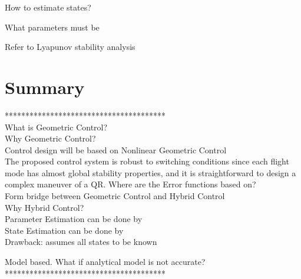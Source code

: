 How to estimate states?



What parameters must be 

Refer to Lyapunov stability analysis \cite{Bullo2005}

\section{Summary}

***************************************\\
What is Geometric Control?\\
Why Geometric Control?\\
Control design will be based on Nonlinear Geometric Control\\

The proposed control system is robust to switching conditions since each flight mode has almost global stability properties, and it is straightforward to design a complex maneuver of a QR. \cite{Lee2010c}
Where are the Error functions based on?\\

Form bridge between Geometric Control and Hybrid Control\\
Why Hybrid Control?\\
Parameter Estimation can be done by\\

State Estimation can be done by\\

Drawback: assumes all states to be known

Model based. What if analytical model is not accurate?
***************************************\\
